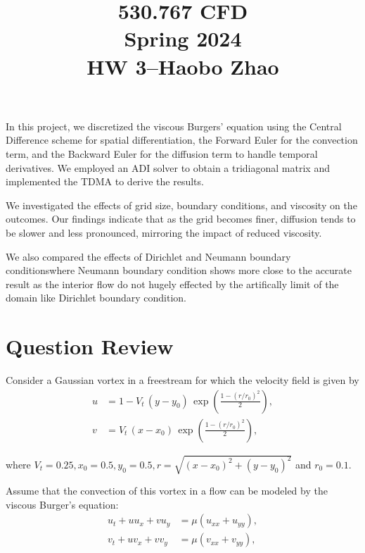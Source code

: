\documentclass[12pt]{article}
\begin{document}
\title{530.767 CFD\\Spring 2024\\HW 3–Haobo Zhao}
\maketitle

In this project, we discretized the viscous Burgers' equation 
using the Central Difference scheme for 
spatial differentiation, the Forward Euler for 
the convection term, and the Backward Euler for 
the diffusion term to handle temporal derivatives. 
We employed an ADI solver 
to obtain a tridiagonal matrix and implemented 
the TDMA to derive the results.

We investigated the effects of grid size, boundary conditions,
 and viscosity on the outcomes. Our findings indicate that as 
 the grid becomes finer, diffusion tends to be slower 
 and less pronounced, mirroring the impact of reduced viscosity.

We also compared the effects of Dirichlet and 
Neumann boundary conditionswhere Neumann boundary condition 
shows more close
to the accurate result as the interior flow do not hugely 
effected by the artifically limit of the domain like Dirichlet 
boundary condition.


\tableofcontents


\section{Question Review}

Consider a Gaussian vortex in a freestream for which the velocity field is given by
\begin{align*}
u &= 1-V_t\,(y-y_0)\,\exp\left(\frac{1-(r/r_0)^2}{2}\right), \\
v &= V_t\,(x-x_0)\,\exp\left(\frac{1-(r/r_0)^2}{2}\right),
\end{align*}

where \( V_t=0.25, x_0=0.5, y_0=0.5, r = \sqrt{(x-x_0)^2 + (y-y_0)^2} \) and \( r_0=0.1 \).

Assume that the convection of this vortex in a flow can be modeled by the viscous Burger’s equation:
\begin{align*}
u_t + uu_x + vu_y &= \mu(u_{xx} + u_{yy}), \\
v_t + uv_x + vv_y &= \mu(v_{xx} + v_{yy}),
\end{align*}
\end{document}

